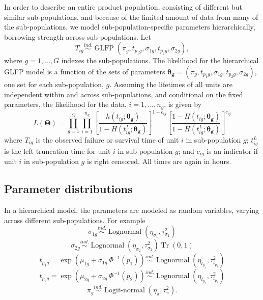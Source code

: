 \documentclass[12pt]{article}
\newcommand{\ind}{\stackrel{ind.}{\sim}}
\newcommand{\op}{\operatorname}
\begin{document}
In order to describe an entire product population, consisting of different but similar sub-populations, and because of the limited amount of data from many of the sub-populations, we model sub-population-specific parameters hierarchically, borrowing strength across sub-populations.  Let
\begin{equation}
T_{ig} \ind \op{GLFP}\left( \pi_g, t_{p_{1}g}, \sigma_{1g}, t_{p_{2}g}, \sigma_{2g} \right),
\end{equation}
where $g=1,\ldots,G$ indexes the sub-populations.  The likelihood for the hierarchical GLFP model is a function of the sets of parameters $\bm{\theta_g} = (\pi_{g}, t_{p_{1}g}, \sigma_{1g}, t_{p_{2}g}, \sigma_{2g})$, one set for each sub-population, $g$.  Assuming the lifetimes of all units are independent within and across sub-populations, and conditional on the fixed parameters, the likelihood for the data, $i=1,\dots,n_g$,  is given by
\begin{equation*}
L(\bm{\Theta})= \prod_{g=1}^{G} \prod_{i=1}^{n_{g}} \left[\frac{h(t_{ig};\bm{\theta_g})}{1-H(t_{ig}^L;\bm{\theta_g})}\right]^{1-c_{ig}} \left[ \frac{1-H(t_{ig};\bm{\theta_g})}{1-H(t_{ig}^L;\bm{\theta_g})} \right]^{c_{ig}}
\end{equation*}
where $T_{ig}$ is the observed failure or survival time of unit $i$ in sub-population $g$; $t_{ig}^L$ is the left truncation time for unit $i$ in sub-population $g$; and $c_{ig}$ is an indicator if unit $i$ in sub-population $g$ is right censored.  All times are again in hours.
\subsection{Parameter distributions}

In a hierarchical model, the parameters are modeled as random variables, varying across different sub-populations.  For example
\begin{equation*}
\sigma_{1g} \ind \op{Lognormal} \left( \eta_{\sigma_1}, \tau^2_{\sigma_1} \right)
\end{equation*}
\begin{equation*}
\sigma_{2g} \ind \op{Lognormal} \left( \eta_{\sigma_2}, \tau^2_{\sigma_2}\right)\op{Tr}\left(0, 1\right)
\end{equation*}
\begin{equation}
\label{eq:hier-model}
t_{p_{1}g} = \exp\left(\mu_{1g} + \sigma_{1g}\,\Phi^{-1}(p_1)\right)  \ind \op{Lognormal} \left(\eta_{t_{p_1}}, \tau^2_{t_{p_1}}\right)
\end{equation}
\begin{equation*}
t_{p_{2}g} = \exp\left(\mu_{2g} + \sigma_{2g}\,\Phi^{-1}(p_2)\right)  \ind \op{Lognormal} \left(\eta_{t_{p_2}}, \tau^2_{t_{p_2}}\right)
\end{equation*}
\begin{equation*}
\pi_g \ind \op{Logit-normal}(\eta_\pi, \tau^2_\pi).
\end{equation*}
\end{document}
